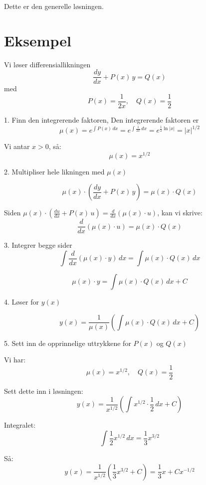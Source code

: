 \documentclass[a4paper,7pt,fleqn]{article}
\begin{document}
Dette er den generelle løsningen.


\section{Eksempel}

Vi løser differensiallikningen
\[
\frac{dy}{dx} + P(x)\,y = Q(x)
\]
med 
\[
P(x) = \frac{1}{2x}, \quad Q(x) = \frac{1}{2}
\]

1. Finn den integrerende faktoren, Den integrerende faktoren er
\[
\mu(x) =e^{\int P(x)\, dx} = e^{\int \frac{1}{2x}\, dx} = e^{\frac{1}{2} \ln |x|} = |x|^{1/2}
\]

Vi antar \(x > 0\), så:
\[
\mu(x) = x^{1/2}
\]

2. Multipliser hele likningen med $\mu(x)$

\[
\mu(x) \cdot \left( \frac{dy}{dx} + P(x)\,y \right) = \mu(x) \cdot Q(x)
\]

Siden \(\mu(x) \cdot \left( \frac{du}{dx} + P(x)\,u \right) = \frac{d}{dx} \left( \mu(x) \cdot u \right)\), kan vi skrive:
\[
\frac{d}{dx} \left( \mu(x) \cdot u \right) = \mu(x) \cdot Q(x)
\] 

3. Integrer begge sider
\[
\int \frac{d}{dx} \left( \mu(x) \cdot y \right)\, dx = \int \mu(x) \cdot Q(x)\, dx
\]

\[
\mu(x) \cdot y = \int \mu(x) \cdot Q(x)\, dx + C
\]

4. Løser for $y(x)$

\[
y(x) = \frac{1}{\mu(x)} \left( \int \mu(x) \cdot Q(x)\, dx + C \right)
\]

5. Sett inn de opprinnelige uttrykkene for $P(x)$ og $Q(x)$

Vi har:
\[
\mu(x) = x^{1/2}, \quad Q(x) = \frac{1}{2}
\]

Sett dette inn i løsningen:
\[
y(x) = \frac{1}{x^{1/2}} \left( \int x^{1/2} \cdot \frac{1}{2}\, dx + C \right)
\]

Integralet:
\[
\int \frac{1}{2} x^{1/2}\, dx = \frac{1}{3} x^{3/2}
\]

Så:
\[
y(x) = \frac{1}{x^{1/2}} \left( \frac{1}{3} x^{3/2} + C \right)
= \frac{1}{3} x + C x^{-1/2}
\]







\newpage
\end{document}
